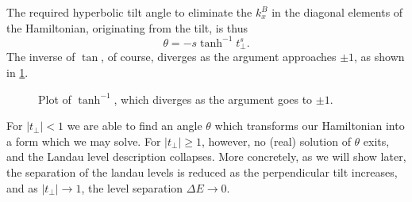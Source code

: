 The required hyperbolic tilt angle to eliminate the \(k^B_{x}\) in the diagonal elements of the Hamiltonian, originating from the tilt, is thus
\begin{equation}
  \label{eq:38}
  \theta = - s \tanh^{-1} t^s_{\perp}.
\end{equation}
The inverse of \(\tan \), of course, diverges as the argument approaches \(\pm 1\), as shown in \cref{fig:arctanh}.
\begin{figure}[ht]
  \centering
  \caption{\label{fig:arctanh} Plot of \(\tanh^{-1}\), which diverges as the argument goes to \(\pm 1\).}
\end{figure}
For \(|t_{\perp}| < 1\) we are able to find an angle \(\theta \) which transforms our Hamiltonian into a form which we may solve.
For \(|t_{\perp}| \geq 1\), however, no (real) solution of \(\theta \) exits, and the Landau level description collapses.
More concretely, as we will show later, the separation of the landau levels is reduced as the perpendicular tilt increases, and as \( |t_\perp| \to 1 \), the level separation \( \Delta E \to 0 \).

